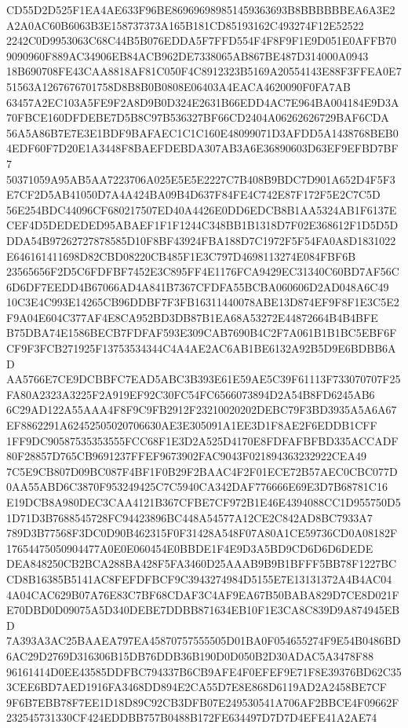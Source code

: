\documentclass[UTF8,fontset=fandol,zihao=-4,a4paper]{ctexart}
\begin{document}
{{CD55D2D525F1EA4AE633F96BE869696989851459363693B8BBBBBBEA6A3E2A2A0AC60B6063B3E158737373A165B181CD85193162C493274F12E52522
2242C0D9953063C68C44B5B076EDDA5F7FFD554F4F8F9F1E9D051E0AFFB709090960F889AC34906EB84ACB962DE7338065AB867BE487D314000A0943
18B690708FE43CAA8818AF81C050F4C8912323B5169A20554143E88F3FFEA0E751563A1267676701758D8B8B0B0808E06403A4EACA4620090F0FA7AB
63457A2EC103A5FE9F2A8D9B0D324E2631B66EDD4AC7E964BA004184E9D3A70FBCE160DFDEBE7D5B8C97B536327BF66CD2404A06262626729BAF6CDA
56A5A86B7E7E3E1BDF9BAFAEC1C1C160E48099071D3AFDD5A1438768BEB04EDF60F7D20E1A3448F8BAEFDEBDA307AB3A6E36890603D63EF9EFBD7BF7
50371059A95AB5AA7223706A025E5E5E2227C7B408B9BDC7D901A652D4F5F3E7CF2D5AB41050D7A4A424BA09B4D637F84FE4C742E87F172F5E2C7C5D
56E254BDC44096CF680217507ED40A4426E0DD6EDCB8B1AA5324AB1F6137ECEF4D5DEDEDED95ABAEF1F1F1244C348BB1B1318D7F02E368612F1D5D5D
DDA54B97262727878585D10F8BF43924FBA188D7C1972F5F54FA0A8D1831022E646161411698D82CBD08220CB485F1E3C797D4698113274E084FBF6B
23565656F2D5C6FDFBF7452E3C895FF4E1176FCA9429EC31340C60BD7AF56C6D6DF7EEDD4B67066AD4A841B7367CFDFA55BCBA060606D2AD048A6C49
10C3E4C993E14265CB96DDBF7F3FB16311440078ABE13D874EF9F8F1E3C5E2F9A04E604C377AF4E8CA952BD3DB87B1EA68A53272E44872664B4B4BFE
B75DBA74E1586BECB7FDFAF593E309CAB7690B4C2F7A061B1B1BC5EBF6FCF9F3FCB271925F13753534344C4A4AE2AC6AB1BE6132A92B5D9E6BDBB6AD
AA5766E7CE9DCBBFC7EAD5ABC3B393E61E59AE5C39F61113F733070707F25FA80A2323A3225F2A919EF92C30FC54FC6566073894D2A54B8FD6245AB6
6C29AD122A55AAA4F8F9C9FB2912F23210020202DEBC79F3BD3935A5A6A67EF8862291A62452505020706630AE3E305091A1EE3D1F8AE2F6EDDB1CFF
1FF9DC90587535353555FCC68F1E3D2A525D4170E8FDFAFBFBD335ACCADF80F28857D765CB9691237FFEF9673902FAC9043F021894363232922CEA49
7C5E9CB807D09BC087F4BF1F0B29F2BAAC4F2F01ECE72B57AEC0CBC077D0AA55ABD6C3870F953249425C7C5940CA342DAF776666E69E3D7B68781C16
E19DCB8A980DEC3CAA4121B367CFBE7CF972B1E46E4394088CC1D955750D51D71D3B7688545728FC94423896BC448A54577A12CE2C842AD8BC7933A7
789D3B77568F3DC0D90B462315F0F31428A548F07A80A1CE59736CD0A08182F17654475050904477A0E0E060454E0BBDE1F4E9D3A5BD9CD6D6D6DEDE
DEA848250CB2BCA288BA428F5FA3460D25AAAB9B9B1BFFF5BB78F1227BCCD8B16385B5141AC8FEFDFBCF9C3943274984D5155E7E13131372A4B4AC04
4A04CAC629B07A76E83C7BF68CDAF3C4AF9EA67B50BABA829D7CE8D021FE70DBD0D09075A5D340DEBE7DDBB871634EB10F1E3CA8C839D9A874945EBD
7A393A3AC25BAAEA797EA45870757555505D01BA0F054655274F9E54B0486BD6AC29D2769D316306B15DB76DDB36B190D0D050B2D30ADAC5A3478F88
96161414D0EE43585DDFBC794337B6CB9AFE4F0EFEF9E71F8E39376BD62C353CEE6BD7AED1916FA3468DD894E2CA55D7E8E868D6119AD2A2458BE7CF
9F6B7EBB78F7EE1D18D89C92CB3DFB07E249530541A706AF2BBCE4F09662F232545731330CF424EDDBB757B0488B172FE634497D7D7D4EFE41A2AE74
}}
\end{document}
